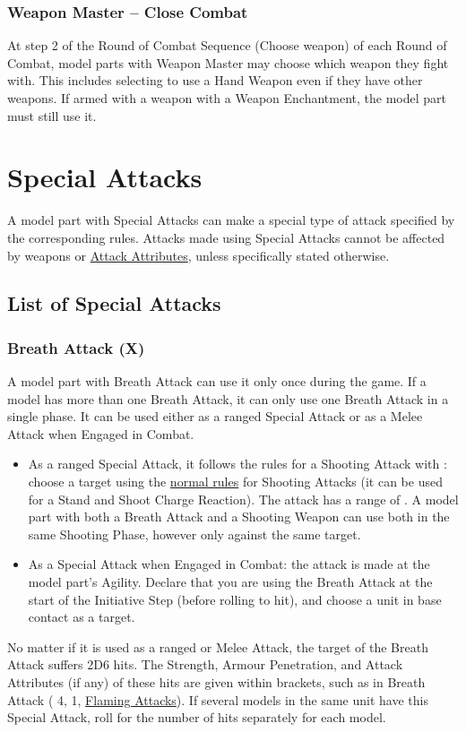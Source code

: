 \subsubsection{Weapon Master -- Close Combat}
\idx[main=y]{\weaponmaster}\label{weapon_master}

At step 2 of the Round of Combat Sequence (Choose weapon) of each Round of Combat, model parts with Weapon Master may choose which weapon they fight with. This includes selecting to use a Hand Weapon even if they have other weapons. If armed with a weapon with a Weapon Enchantment, the model part must still use it.

\section{Special Attacks}
\idx[main=y]{\specialattacks}\label{special_attacks}

A model part with Special Attacks can make a special type of attack specified by the corresponding rules. Attacks made using Special Attacks cannot be affected by weapons or \hyperref[attack_attributes]{Attack Attributes}, unless specifically stated otherwise.

\subsection{List of Special Attacks}

\subsubsection{Breath Attack (X)}
\idx[main=y]{\breathattack{}}\label{breath_attack}

A model part with Breath Attack can use it only once during the game. If a model has more than one Breath Attack, it can only use one Breath Attack in a single phase. It can be used either as a ranged Special Attack or as a Melee Attack when Engaged in Combat.
\begin{itemize}
	\item As a ranged Special Attack, it follows the rules for a Shooting Attack with \textbf{\marchandshoot}: choose a target using the \hyperref[shooting_with_a_unit]{normal rules} for Shooting Attacks (it can be used for a Stand and Shoot Charge Reaction). The attack has a range of . A model part with both a Breath Attack and a Shooting Weapon can use both in the same Shooting Phase, however only against the same target.
	\item As a Special Attack when Engaged in Combat: the attack is made at the model part's Agility. Declare that you are using the Breath Attack at the start of the Initiative Step (before rolling to hit), and choose a unit in base contact as a target.
\end{itemize}
No matter if it is used as a ranged or Melee Attack, the target of the Breath Attack suffers 2D6 hits. The Strength, Armour Penetration, and Attack Attributes (if any) of these hits are given within brackets, such as in Breath Attack (\St{} 4, \AP{} 1, \hyperref[flaming_attacks]{Flaming Attacks}). If several models in the same unit have this Special Attack, roll for the number of hits separately for each model.


